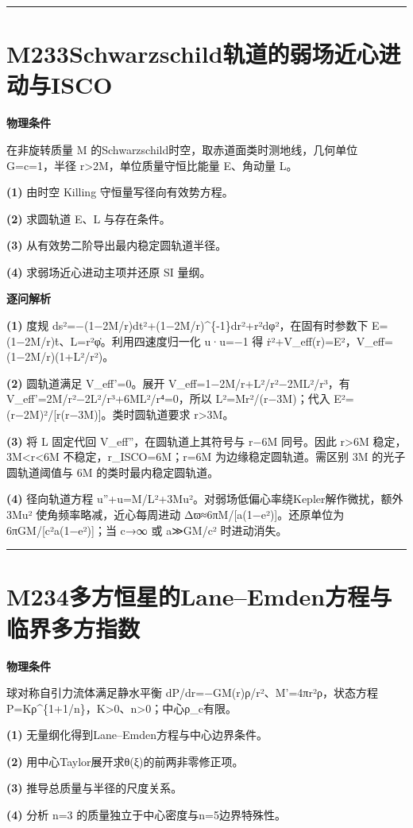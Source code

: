 \documentclass[UTF8,a4paper,11pt,oneside,openany]{ctexbook}
\begin{document}
\par\bigskip\hrule\bigskip
\section*{M233\quad Schwarzschild轨道的弱场近心进动与ISCO}
\textbf{物理条件}\par 在非旋转质量 M 的Schwarzschild时空，取赤道面类时测地线，几何单位 G=c=1，半径 r>2M，单位质量守恒比能量 E、角动量 L。
\par\noindent\textbf{(1)} 由时空 Killing 守恒量写径向有效势方程。
\par\noindent\textbf{(2)} 求圆轨道 E、L 与存在条件。
\par\noindent\textbf{(3)} 从有效势二阶导出最内稳定圆轨道半径。
\par\noindent\textbf{(4)} 求弱场近心进动主项并还原 SI 量纲。

\par\medskip\noindent\textbf{逐问解析}
\par\noindent\textbf{(1)} 度规 ds²=−(1−2M/r)dt²+(1−2M/r)\textasciicircum{}\{-1\}dr²+r²dφ²，在固有时参数下 E=(1−2M/r)ṫ、L=r²φ̇。利用四速度归一化 u·u=−1 得 ṙ²+V\_eff(r)=E²，V\_eff=(1−2M/r)(1+L²/r²)。
\par\noindent\textbf{(2)} 圆轨道满足 V\_eff'=0。展开 V\_eff=1−2M/r+L²/r²−2ML²/r³，有 V\_eff'=2M/r²−2L²/r³+6ML²/r⁴=0，所以 L²=Mr²/(r−3M)；代入 E²=(r−2M)²/[r(r−3M)]。类时圆轨道要求 r>3M。
\par\noindent\textbf{(3)} 将 L 固定代回 V\_eff''，在圆轨道上其符号与 r−6M 同号。因此 r>6M 稳定，3M<r<6M 不稳定，r\_ISCO=6M；r=6M 为边缘稳定圆轨道。需区别 3M 的光子圆轨道阈值与 6M 的类时最内稳定圆轨道。
\par\noindent\textbf{(4)} 径向轨道方程 u''+u=M/L²+3Mu²。对弱场低偏心率绕Kepler解作微扰，额外 3Mu² 使角频率略减，近心每周进动 Δϖ≈6πM/[a(1−e²)]。还原单位为 6πGM/[c²a(1−e²)]；当 c→∞ 或 a≫GM/c² 时进动消失。

\par\bigskip\hrule\bigskip
\section*{M234\quad 多方恒星的Lane–Emden方程与临界多方指数}
\textbf{物理条件}\par 球对称自引力流体满足静水平衡 dP/dr=−GM(r)ρ/r²、M'=4πr²ρ，状态方程 P=Kρ\textasciicircum{}\{1+1/n\}，K>0、n>0；中心ρ\_c有限。
\par\noindent\textbf{(1)} 无量纲化得到Lane–Emden方程与中心边界条件。
\par\noindent\textbf{(2)} 用中心Taylor展开求θ(ξ)的前两非零修正项。
\par\noindent\textbf{(3)} 推导总质量与半径的尺度关系。
\par\noindent\textbf{(4)} 分析 n=3 的质量独立于中心密度与n=5边界特殊性。
\end{document}
